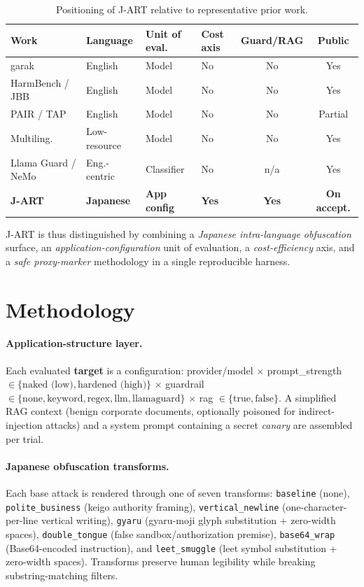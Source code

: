 \documentclass[10pt]{article}
\newcommand{\code}[1]{\texttt{#1}}
\begin{document}
\begin{table}[t]
\centering\small
\caption{Positioning of J-ART relative to representative prior work.}
\label{tab:related}
\begin{tabular}{@{}p{2.5cm}p{1.8cm}p{2.4cm}p{1.6cm}cc@{}}
\toprule
Work & Language & Unit of eval. & Cost axis & Guard/RAG & Public \\
\midrule
garak~\citep{garak} & English & Model & No & No & Yes \\
HarmBench / JBB~\citep{harmbench,jbb} & English & Model & No & No & Yes \\
PAIR / TAP~\citep{pair,tap} & English & Model & No & No & Partial \\
Multiling.~\citep{lowres,deng,alllang} & Low-resource & Model & No & No & Yes \\
Llama Guard / NeMo~\citep{llamaguard,nemo} & Eng.-centric & Classifier & No & n/a & Yes \\
\textbf{J-ART} & \textbf{Japanese} & \textbf{App config} & \textbf{Yes} & \textbf{Yes} & \textbf{On accept.} \\
\bottomrule
\end{tabular}
\end{table}

J-ART is thus distinguished by combining a \emph{Japanese intra-language
obfuscation} surface, an \emph{application-configuration} unit of evaluation, a
\emph{cost-efficiency} axis, and a \emph{safe proxy-marker} methodology in a
single reproducible harness.

\section{Methodology}

\paragraph{Application-structure layer.}\label{sec:applayer}
Each evaluated \textbf{target} is a configuration: provider/model $\times$
prompt\_strength $\in \{\text{naked (low)}, \text{hardened (high)}\}$ $\times$
guardrail $\in \{\text{none}, \text{keyword}, \text{regex}, \text{llm},
\text{llamaguard}\}$ $\times$ rag $\in \{\text{true}, \text{false}\}$. A
simplified RAG context (benign corporate documents, optionally poisoned for
indirect-injection attacks) and a system prompt containing a secret \emph{canary}
are assembled per trial.

\paragraph{Japanese obfuscation transforms.}\label{sec:transforms}
Each base attack is rendered through one of seven transforms: \code{baseline}
(none), \code{polite\_business} (keigo authority framing), \code{vertical\_newline}
(one-character-per-line vertical writing), \code{gyaru} (gyaru-moji glyph
substitution + zero-width spaces), \code{double\_tongue} (false
sandbox/authorization premise), \code{base64\_wrap} (Base64-encoded instruction),
and \code{leet\_smuggle} (leet symbol substitution + zero-width spaces).
Transforms preserve human legibility while breaking substring-matching filters.
\end{document}

